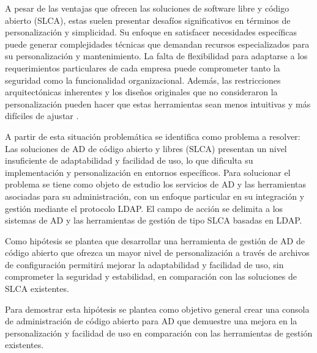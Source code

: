 A pesar de las ventajas que ofrecen las soluciones de software libre y código abierto (SLCA), estas suelen presentar desafíos significativos en términos de personalización y simplicidad. Su enfoque en satisfacer necesidades específicas puede generar complejidades técnicas que demandan recursos especializados para su personalización y mantenimiento. La falta de flexibilidad para adaptarse a los requerimientos particulares de cada empresa puede comprometer tanto la seguridad como la funcionalidad organizacional. Además, las restricciones arquitectónicas inherentes y los diseños originales que no consideraron la personalización pueden hacer que estas herramientas sean menos intuitivas y más difíciles de ajustar \autocite{stallman_free_2002,feller_understanding_2002,raymond_cathedral_2001}.

A partir de esta situación problemática se identifica como problema a resolver: Las soluciones de AD de código abierto y libres (SLCA) presentan un nivel insuficiente de adaptabilidad y facilidad de uso, lo que dificulta su implementación y personalización en entornos específicos. Para solucionar el problema se tiene como objeto de estudio los servicios de AD y las herramientas asociadas para su administración, con un enfoque particular en su integración y gestión mediante el protocolo LDAP. El campo de acción se delimita a los sistemas de AD y las herramientas de gestión de tipo SLCA basadas en LDAP.

Como hipótesis se plantea que desarrollar una herramienta de gestión de AD de código abierto que ofrezca un mayor nivel de personalización a través de archivos de configuración permitirá mejorar la adaptabilidad y facilidad de uso, sin comprometer la seguridad y estabilidad, en comparación con las soluciones de SLCA existentes.

Para demostrar esta hipótesis se plantea como objetivo general crear una consola de administración de código abierto para AD que demuestre una mejora en la personalización y facilidad de uso en comparación con las herramientas de gestión existentes.







